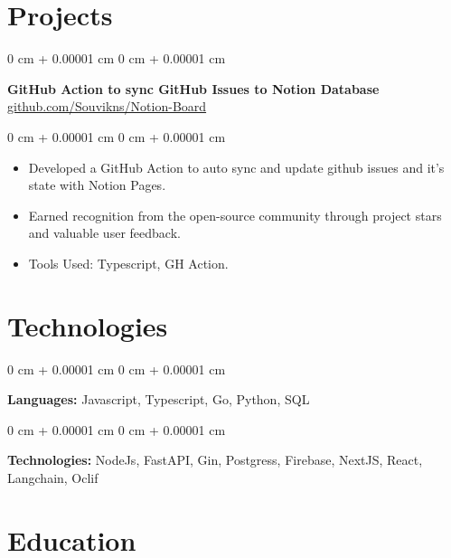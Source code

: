 \documentclass[10pt, letterpaper]{article}
\newenvironment{highlights}{
    \begin{itemize}[
        topsep=0.10 cm,
        parsep=0.10 cm,
        partopsep=0pt,
        itemsep=0pt,
        leftmargin=0 cm + 10pt
    ]
}{
    \end{itemize}
} %
\newenvironment{onecolentry}{
    \begin{adjustwidth}{
        0 cm + 0.00001 cm
    }{
        0 cm + 0.00001 cm
    }
}{
    \end{adjustwidth}
} %
\newenvironment{twocolentry}[2][]{
    \onecolentry
    \def\secondColumn{#2}
    \setcolumnwidth{\fill, 4.5 cm}
    \begin{paracol}{2}
}{
    \switchcolumn \raggedleft \secondColumn
    \end{paracol}
    \endonecolentry
} %
\begin{document}
    \section{Projects}



        
        \begin{twocolentry}{
            \href{https://github.com/Souvikns/Notion-Board}{github.com/Souvikns/Notion-Board}
        }
            \textbf{GitHub Action to sync GitHub Issues to Notion Database}\end{twocolentry}

        \vspace{0.10 cm}
        \begin{onecolentry}
            \begin{highlights}
                \item Developed a GitHub Action to auto sync and update github issues and it's state with Notion Pages.
                \item Earned recognition from the open-source community through project stars and valuable user feedback.
                \item Tools Used: Typescript, GH Action.
                
            \end{highlights}
        \end{onecolentry}

    
    \section{Technologies}



        
        \begin{onecolentry}
            \textbf{Languages:} Javascript, Typescript, Go, Python, SQL
        \end{onecolentry}

        \vspace{0.2 cm}

        \begin{onecolentry}
            \textbf{Technologies:} NodeJs, FastAPI, Gin, Postgress, Firebase, NextJS, React, Langchain, Oclif 
        \end{onecolentry}

    
    \section{Education}
\end{document}
